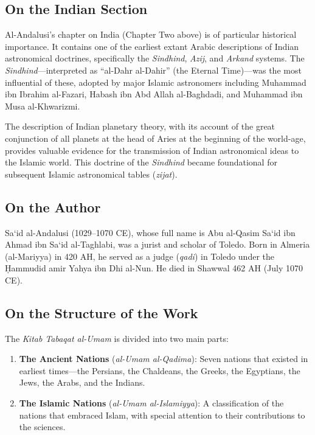 \documentclass[11pt,a4paper]{article}
\begin{document}
\subsection*{On the Indian Section}

Al-Andalusi's chapter on India (Chapter Two above) is of particular historical importance. It contains one of the earliest extant Arabic descriptions of Indian astronomical doctrines, specifically the \textit{Sindhind}, \textit{Azij}, and \textit{Arkand} systems. The \textit{Sindhind}---interpreted as ``al-Dahr al-Dahir'' (the Eternal Time)---was the most influential of these, adopted by major Islamic astronomers including Muhammad ibn Ibrahim al-Fazari, Habash ibn Abd Allah al-Baghdadi, and Muhammad ibn Musa al-Khwarizmi.

The description of Indian planetary theory, with its account of the great conjunction of all planets at the head of Aries at the beginning of the world-age, provides valuable evidence for the transmission of Indian astronomical ideas to the Islamic world. This doctrine of the \textit{Sindhind} became foundational for subsequent Islamic astronomical tables (\textit{zijat}).

\subsection*{On the Author}

Sa\textquoteleft id al-Andalusi (1029--1070 CE), whose full name is Abu al-Qasim Sa\textquoteleft id ibn Ahmad ibn Sa\textquoteleft id al-Taghlabi, was a jurist and scholar of Toledo. Born in Almeria (al-Mariyya) in 420 AH, he served as a judge (\textit{qadi}) in Toledo under the \d{H}ammudid amir Yahya ibn Dhi al-Nun. He died in Shawwal 462 AH (July 1070 CE).

\subsection*{On the Structure of the Work}

The \textit{Kitab Tabaqat al-Umam} is divided into two main parts:

\begin{enumerate}
  \item \textbf{The Ancient Nations} (\textit{al-Umam al-Qadima}): Seven nations that existed in earliest times---the Persians, the Chaldeans, the Greeks, the Egyptians, the Jews, the Arabs, and the Indians.
  \item \textbf{The Islamic Nations} (\textit{al-Umam al-Islamiyya}): A classification of the nations that embraced Islam, with special attention to their contributions to the sciences.
\end{enumerate}
\end{document}
